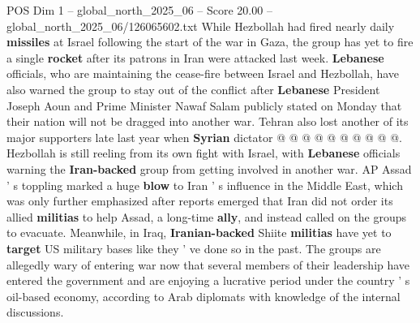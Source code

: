 \begin{textsample}{POS Dim 1 – global\_north\_2025\_06 – Score 20.00 – global\_north\_2025\_06/126065602.txt}
While Hezbollah had fired nearly daily \textbf{missiles} at Israel following the start of the war in Gaza, the group has yet to fire a single \textbf{rocket} after its patrons in Iran were attacked last week. \textbf{Lebanese} officials, who are maintaining the cease-fire between Israel and Hezbollah, have also warned the group to stay out of the conflict after \textbf{Lebanese} President Joseph Aoun and Prime Minister Nawaf Salam publicly stated on Monday that their nation will not be dragged into another war.
Tehran also lost another of its major supporters late last year when \textbf{Syrian} dictator @ @ @ @ @ @ @ @ @ @.
Hezbollah is still reeling from its own fight with Israel, with \textbf{Lebanese} officials warning the \textbf{Iran-backed} group from getting involved in another war.
AP Assad ' s toppling marked a huge \textbf{blow} to Iran ' s influence in the Middle East, which was only further emphasized after reports emerged that Iran did not order its allied \textbf{militias} to help Assad, a long-time \textbf{ally}, and instead called on the groups to evacuate.
Meanwhile, in Iraq, \textbf{Iranian-backed} Shiite \textbf{militias} have yet to \textbf{target} US military bases like they ' ve done so in the past.
The groups are allegedly wary of entering war now that several members of their leadership have entered the government and are enjoying a lucrative period under the country ' s oil-based economy, according to Arab diplomats with knowledge of the internal discussions.

\end{textsample}
